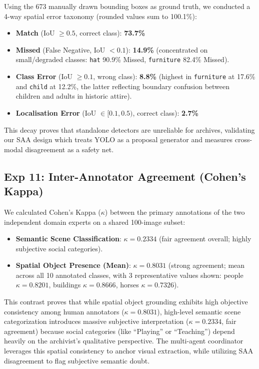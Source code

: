 \documentclass[11pt,a4paper]{article}
\newcommand{\term}[1]{\textbf{#1}}
\begin{document}
Using the 673 manually drawn bounding boxes as ground truth, we conducted a 4-way spatial error taxonomy (rounded values sum to 100.1\%):
\begin{itemize}[noitemsep]
    \item \term{Match} (IoU $\ge 0.5$, correct class): \textbf{73.7\%}
    \item \term{Missed} (False Negative, IoU $< 0.1$): \textbf{14.9\%} (concentrated on small/degraded classes: \texttt{hat} 90.9\% Missed, \texttt{furniture} 82.4\% Missed).
    \item \term{Class Error} (IoU $\ge 0.1$, wrong class): \textbf{8.8\%} (highest in \texttt{furniture} at 17.6\% and \texttt{child} at 12.2\%, the latter reflecting boundary confusion between children and adults in historic attire).
    \item \term{Localisation Error} (IoU $\in [0.1, 0.5)$, correct class): \textbf{2.7\%}
\end{itemize}
This decay proves that standalone detectors are unreliable for archives, validating our SAA design which treats YOLO as a proposal generator and measures cross-modal disagreement as a safety net.

\subsection{Exp 11: Inter-Annotator Agreement (Cohen's Kappa)}\label{sec:inter_annotator_agreement}
We calculated Cohen's Kappa ($\kappa$) between the primary annotations of the two independent domain experts on a shared 100-image subset:
\begin{itemize}[noitemsep]
    \item \term{Semantic Scene Classification}: $\kappa = \mathbf{0.2334}$ (fair agreement overall; highly subjective social categories).
    \item \term{Spatial Object Presence (Mean)}: $\kappa = \mathbf{0.8031}$ (strong agreement; mean across all 10 annotated classes, with 3 representative values shown: people $\kappa=0.8201$, buildings $\kappa=0.8666$, horses $\kappa=0.7326$).
\end{itemize}
This contrast proves that while spatial object grounding exhibits high objective consistency among human annotators ($\kappa=0.8031$), high-level semantic scene categorization introduces massive subjective interpretation ($\kappa=0.2334$, fair agreement) because social categories (like ``Playing'' or ``Teaching'') depend heavily on the archivist's qualitative perspective. The multi-agent coordinator leverages this spatial consistency to anchor visual extraction, while utilizing SAA disagreement to flag subjective semantic doubt.
\end{document}
